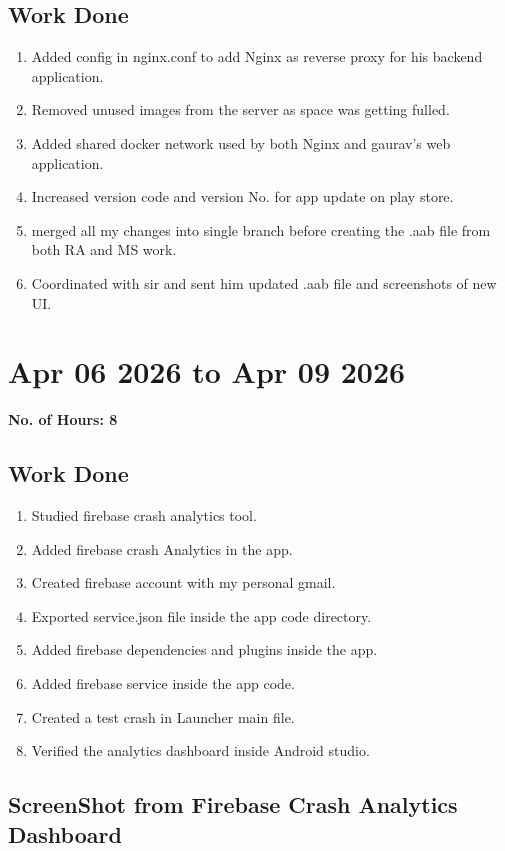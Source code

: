 \documentclass[12pt]{article}
\begin{document}
\subsection{Work Done}
\begin{enumerate}
    \item Added config in nginx.conf to add Nginx as reverse proxy for his backend application.
    \item Removed unused images from the server as space was getting fulled.
    \item Added shared docker network used by both Nginx and gaurav's web application.
    \item Increased version code and version No. for app update on play store.
      \item merged all my changes into single branch before creating the .aab file from both RA and MS work.
      
    \item Coordinated with sir and sent him updated .aab file and screenshots of new UI.
\end{enumerate}
\section{Apr 06 2026 to Apr 09 2026}
{\bf No. of Hours: 8}
\subsection{Work Done}
\begin{enumerate}
    \item Studied firebase crash analytics tool.
    \item Added firebase crash Analytics in the app.
    \item Created firebase account with my personal gmail.
    \item Exported service.json file inside the app code directory.
    \item Added firebase dependencies and   plugins inside the app.
    \item Added firebase service inside the app code.
    \item Created a test crash in Launcher main file.
    \item Verified the analytics dashboard inside Android studio.
\end{enumerate}
\subsection{ScreenShot from Firebase Crash Analytics Dashboard}
\end{document}
